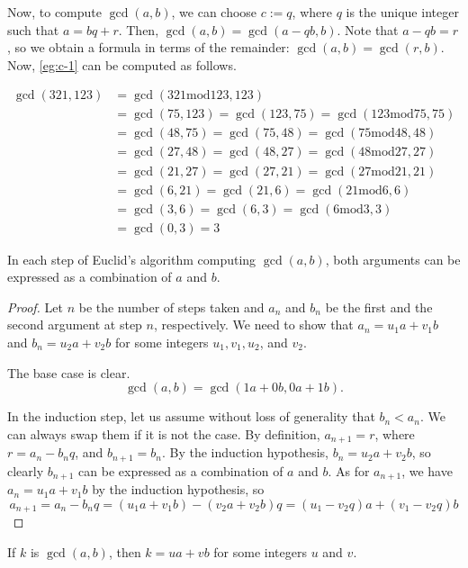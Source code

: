 \documentclass[article,10pt,oneside]{memoir}
\newcommand{\modulo}{\mathrel{\mathrm{mod}}}
\begin{document}
Now, to compute $\gcd(a, b)$, we can choose $c := q$, where $q$ is the unique integer such that $a = bq + r$.
Then, $\gcd(a, b) = \gcd(a - qb, b)$.
Note that $a - qb = r$, so we obtain a formula in terms of the remainder: $\gcd(a, b) = \gcd(r, b)$.
Now, \cref{eg:c-1} can be computed as follows.

\begin{eg}
  \begin{align}
    \gcd(321, 123) &= \gcd(321 \modulo 123, 123)\\
                   &= \gcd(75, 123) = \gcd(123, 75) = \gcd(123 \modulo 75, 75)\\
                   &= \gcd(48, 75) = \gcd(75, 48) = \gcd(75 \modulo 48, 48)\\
                   &= \gcd(27, 48) = \gcd(48, 27) = \gcd(48 \modulo 27, 27)\\
                   &= \gcd(21, 27) = \gcd(27, 21) = \gcd(27 \modulo 21, 21)\\
                   &= \gcd(6, 21) = \gcd(21, 6) = \gcd(21 \modulo 6, 6)\\
                   &= \gcd(3, 6) = \gcd(6, 3) = \gcd(6 \modulo 3, 3)\\
                   &= \gcd(0, 3) = 3
  \end{align}
\end{eg}

\begin{thm}
  In each step of Euclid's algorithm computing $\gcd(a, b)$, both arguments can be expressed as a combination of $a$ and $b$.
\end{thm}
\begin{proof}
  Let $n$ be the number of steps taken and $a_{n}$ and $b_{n}$ be the first and the second argument at step $n$, respectively.
  We need to show that $a_{n} = u_{1}a + v_{1}b$ and $b_{n} = u_{2}a + v_{2}b$ for some integers $u_{1}, v_{1}, u_{2}$, and $v_{2}$.

  The base case is clear.
  \[
    \gcd(a, b) = \gcd(1a + 0b, 0a + 1b).
  \]
  
  In the induction step, let us assume without loss of generality that $b_{n} < a_{n}$.
  We can always swap them if it is not the case.
  By definition, $a_{n+1} = r$, where $r = a_{n} - b_{n}q$, and $b_{n+1} = b_{n}$.
  By the induction hypothesis, $b_{n} = u_{2}a + v_{2}b$, so clearly $b_{n+1}$ can be expressed as a combination of $a$ and $b$.
  As for $a_{n+1}$, we have $a_{n} = u_{1}a + v_{1}b$ by the induction hypothesis, so
  \[
    a_{n+1} = a_{n} - b_{n}q = (u_{1}a + v_{1}b) - (v_{2}a + v_{2}b)q = (u_{1} - v_{2}q)a + (v_{1} - v_{2}q)b
  \]
\end{proof}

\begin{cor}
  If $k$ is $\gcd(a, b)$, then $k = ua + vb$ for some integers $u$ and $v$.
\end{cor}



\end{document}
